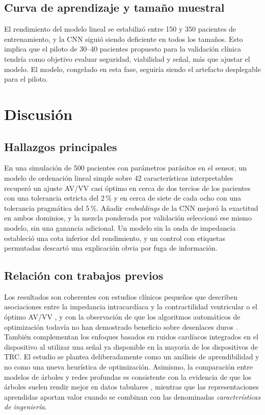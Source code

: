 \documentclass[11pt,a4paper]{article}
\begin{document}
\subsection{Curva de aprendizaje y tamaño muestral}

El rendimiento del modelo lineal se estabilizó entre 150 y 350 pacientes de
entrenamiento, y la CNN siguió siendo deficiente en todos los tamaños. Esto
implica que el piloto de 30--40 pacientes propuesto para la validación clínica
tendría como objetivo evaluar seguridad, viabilidad y señal, más que ajustar el
modelo. El modelo, congelado en esta fase, seguiría siendo el artefacto
desplegable para el piloto.

\section{Discusión}

\subsection{Hallazgos principales}

En una simulación de 500 pacientes con parámetros parásitos en el sensor, un
modelo de ordenación lineal simple sobre 42 características interpretables
recuperó un ajuste AV/VV casi óptimo en cerca de dos tercios de los pacientes con
una tolerancia estricta del 2\,\% y en cerca de siete de cada ocho con una
tolerancia pragmática del 5\,\%. Añadir \emph{embeddings} de la CNN mejoró la
exactitud en ambos dominios, y la mezcla ponderada por validación seleccionó ese
mismo modelo, sin una ganancia adicional. Un modelo sin la onda de impedancia
estableció una cota inferior del rendimiento, y un control con etiquetas
permutadas descartó una explicación obvia por fuga de información.

\subsection{Relación con trabajos previos}

Los resultados son coherentes con estudios clínicos pequeños que describen
asociaciones entre la impedancia intracardíaca y la contractilidad ventricular o
el óptimo AV/VV \citep{bocchiardo2010,ginks2011}, y con la observación de que los
algoritmos automáticos de optimización todavía no han demostrado beneficio sobre
desenlaces duros \citep{knijnik2023}. También complementan los enfoques basados
en ruidos cardíacos integrados en el dispositivo \citep{westphal2023} al utilizar
una señal ya disponible en la mayoría de los dispositivos de TRC. El estudio se
plantea deliberadamente como un análisis de aprendibilidad y no como una nueva
heurística de optimización. Asimismo, la comparación entre modelos de árboles y
redes profundas es consistente con la evidencia de que los árboles suelen rendir
mejor en datos tabulares \citep{grinsztajn2022,holzmuller2024}, mientras que las
representaciones aprendidas aportan valor cuando se combinan con las denominadas
\emph{características de ingeniería}.
\end{document}
